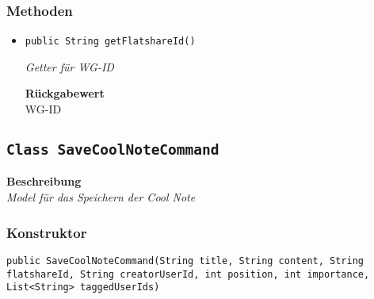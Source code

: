     \subsubsection*{Methoden}
    \begin{itemize}
    	\item{\texttt{public String getFlatshareId()}}
    	
    	\textit{Getter für WG-ID}
    	
    	
    	
    	\textbf{Rückgabewert} \\
    	WG-ID
    \end{itemize}
    \subsection{\texttt{Class SaveCoolNoteCommand}}
    \textbf{Beschreibung} \\
    \textit{Model für das Speichern der Cool Note}
    \subsubsection*{Konstruktor}
    \texttt{public SaveCoolNoteCommand(String title, String content, String flatshareId, String creatorUserId, int position, int importance, List<String> taggedUserIds)}
